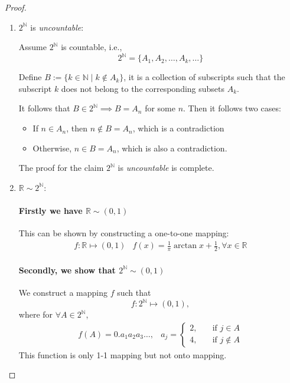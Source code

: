 \begin{proof}
\begin{enumerate}
\item
$2^{\mathbb{N}}$ is \emph{uncountable}:

Assume $2^{\mathbb{N}}$ is countable, i.e.,
\[
2^{\mathbb{N}} = \{A_1,A_2,\dots,A_k,\dots\}
\]

Define $B:=\{k\in\mathbb{N}\mid k\notin A_k\}$, it is a collection of subscripts such that the subscript $k$ does not belong to the corresponding subsets $A_k$.

It follows that $B\in2^{\mathbb{N}}\implies B=A_n$ for some $n$. Then it follows two cases:
\begin{itemize}
\item
If $n\in A_n$, then $n\notin B=A_n$, which is a contradiction
\item
Otherwise, $n\in B=A_n$, which is also a contradiction.
\end{itemize}
The proof for the claim $2^{\mathbb{N}}$ is \emph{uncountable} is complete.
\item
$\mathbb{R}\sim 2^{\mathbb{N}}$:

\paragraph{Firstly we have $\mathbb{R}\sim(0,1)$} This can be shown by constructing a one-to-one mapping:
\[
\begin{array}{ll}
f:\mathbb{R}\mapsto(0,1)
&
f(x)=\frac{1}{\pi}\arctan x+\frac{1}{2},\forall x\in\mathbb{R}
\end{array}
\]

\paragraph{Secondly, we show that $2^{\mathbb{N}}\sim(0,1)$} We construct a mapping $f$ such that
\[
f:2^{\mathbb{N}}\mapsto(0,1), 
\]
where for $\forall A\in2^{\mathbb{N}}$, 
\[
\begin{array}{ll}
f(A)=0.a_1a_2a_3\dots,
&
a_j=\left\{
\begin{aligned}
2,&\quad\mbox{if }j\in A\\
4,&\quad\mbox{if }j\notin A
\end{aligned}
\right.
\end{array}
\]
This function is only 1-1 mapping but not onto mapping.


\end{enumerate}
\end{proof}
